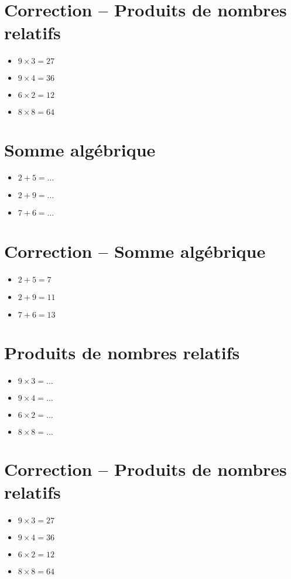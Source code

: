 \documentclass[a4paper,11pt,fleqn]{article}
\begin{document}
\section{Correction -- Produits de nombres relatifs}
\begin{itemize}

  \item $9\times3=27$
  \item $9\times4=36$
  \item $6\times2=12$
  \item $8\times8=64$
\end{itemize}
\newpage
\setcounter{exo}{0}
\setcounter{section}{0}
\section{Somme algébrique}
\begin{itemize}

3
3
3
3
3
3
3
3
3
3
  \item $2+5=\ldots$
  \item $2+9=\ldots$
  \item $7+6=\ldots$
\end{itemize}

\section{Correction -- Somme algébrique}
\begin{itemize}

  \item $2+5=7$
  \item $2+9=11$
  \item $7+6=13$
\end{itemize}

\section{Produits de nombres relatifs}
\begin{itemize}

  \item $9\times3=\ldots$
  \item $9\times4=\ldots$
  \item $6\times2=\ldots$
  \item $8\times8=\ldots$
\end{itemize}

\section{Correction -- Produits de nombres relatifs}
\begin{itemize}

  \item $9\times3=27$
  \item $9\times4=36$
  \item $6\times2=12$
  \item $8\times8=64$
\end{itemize}
\newpage
\setcounter{exo}{0}
\setcounter{section}{0}
\end{document}
